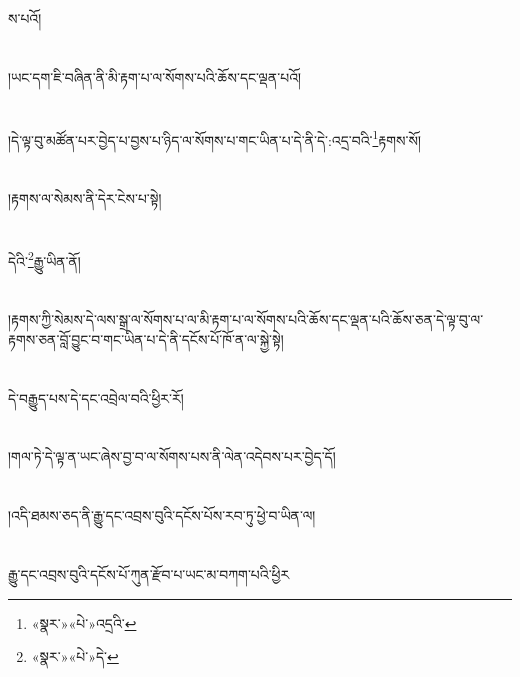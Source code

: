 ས་པའོ།\chapter{ }།ཡང་དག་ཇི་བཞིན་ནི་མི་རྟག་པ་ལ་སོགས་པའི་ཆོས་དང་ལྡན་པའོ།\chapter{ }།དེ་ལྟ་བུ་མཚོན་པར་བྱེད་པ་བྱས་པ་ཉིད་ལ་སོགས་པ་གང་ཡིན་པ་དེ་ནི་དེ་:འདྲ་བའི་\footnote{«སྣར་»«པེ་»འདྲའི་}རྟགས་སོ།\chapter{ }།རྟགས་ལ་སེམས་ནི་དེར་ངེས་པ་སྟེ།\chapter{ }དེའི་\footnote{«སྣར་»«པེ་»དེ་}རྒྱུ་ཡིན་ནོ།\chapter{ }།རྟགས་ཀྱི་སེམས་དེ་ལས་སྒྲ་ལ་སོགས་པ་ལ་མི་རྟག་པ་ལ་སོགས་པའི་ཆོས་དང་ལྡན་པའི་ཆོས་ཅན་དེ་ལྟ་བུ་ལ་རྟགས་ཅན་བློ་བྱུང་བ་གང་ཡིན་པ་དེ་ནི་དངོས་པོ་ཁོ་ན་ལ་སྐྱེ་སྟེ།\chapter{ }དེ་བརྒྱུད་པས་དེ་དང་འབྲེལ་བའི་ཕྱིར་རོ།\chapter{ }།གལ་ཏེ་དེ་ལྟ་ན་ཡང་ཞེས་བྱ་བ་ལ་སོགས་པས་ནི་ལེན་འདེབས་པར་བྱེད་དོ།\chapter{ }།འདི་ཐམས་ཅད་ནི་རྒྱུ་དང་འབྲས་བུའི་དངོས་པོས་རབ་ཏུ་ཕྱེ་བ་ཡིན་ལ།\chapter{ }རྒྱུ་དང་འབྲས་བུའི་དངོས་པོ་ཀུན་རྫོབ་པ་ཡང་མ་བཀག་པའི་ཕྱིར